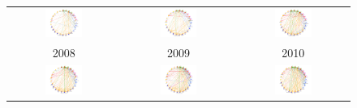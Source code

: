 \documentclass[12pt]{article}
\begin{document}
\begin{figure}[H]
\begin{tabular}{ccc}
\includegraphics[width=0.35\textwidth]{images/rede-2008.pdf} &   \includegraphics[width=0.35\textwidth]{images/rede-2009.pdf} &
\includegraphics[width=0.35\textwidth]{images/rede-2010.pdf}\\
2008 & 2009 & 2010\\[6pt] 
\includegraphics[width=0.35\textwidth]{images/rede-2011.pdf} &
\includegraphics[width=0.35\textwidth]{images/rede-2012.pdf} &   \includegraphics[width=0.35\textwidth]{images/rede-2013.pdf} \\

\end{tabular}
\end{figure}
\end{document}
